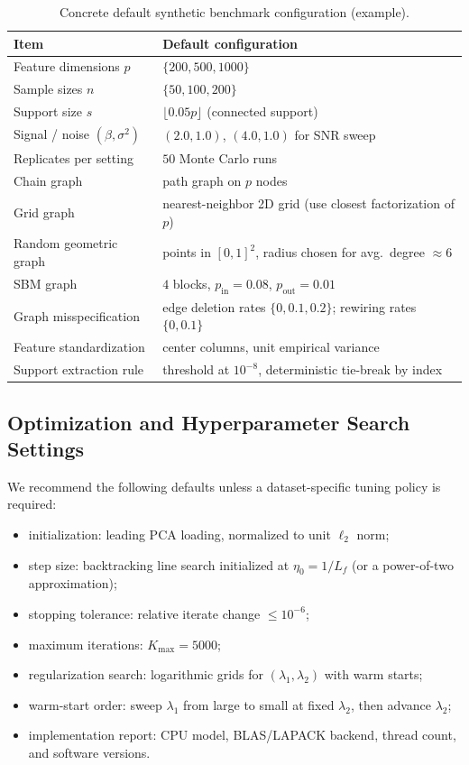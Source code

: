 \documentclass[10pt,twocolumn,letterpaper]{article}
\theoremstyle{definition}
\begin{document}
\begin{table}[t]
\centering
\caption{Concrete default synthetic benchmark configuration (example).}
\label{tab:synthetic_config}
\scriptsize
\begin{tabularx}{\columnwidth}{@{}lY@{}}
\toprule
Item & Default configuration \\
\midrule
Feature dimensions $p$ & $\{200,500,1000\}$ \\
Sample sizes $n$ & $\{50,100,200\}$ \\
Support size $s$ & $\lfloor 0.05p \rfloor$ (connected support) \\
Signal / noise $(\beta,\sigma^2)$ & $(2.0,1.0)$, $(4.0,1.0)$ for SNR sweep \\
Replicates per setting & $50$ Monte Carlo runs \\
Chain graph & path graph on $p$ nodes \\
Grid graph & nearest-neighbor 2D grid (use closest factorization of $p$) \\
Random geometric graph & points in $[0,1]^2$, radius chosen for avg.\ degree $\approx 6$ \\
SBM graph & $4$ blocks, $p_{\mathrm{in}}=0.08$, $p_{\mathrm{out}}=0.01$ \\
Graph misspecification & edge deletion rates $\{0,0.1,0.2\}$; rewiring rates $\{0,0.1\}$ \\
Feature standardization & center columns, unit empirical variance \\
Support extraction rule & threshold at $10^{-8}$, deterministic tie-break by index \\
\bottomrule
\end{tabularx}
\normalsize
\end{table}

\subsection{Optimization and Hyperparameter Search Settings}
We recommend the following defaults unless a dataset-specific tuning policy is required:
\begin{itemize}[leftmargin=*]
\item initialization: leading PCA loading, normalized to unit $\ell_2$ norm;
\item step size: backtracking line search initialized at $\eta_0=1/L_f$ (or a power-of-two approximation);
\item stopping tolerance: relative iterate change $\le 10^{-6}$;
\item maximum iterations: $K_{\max}=5000$;
\item regularization search: logarithmic grids for $(\lambda_1,\lambda_2)$ with warm starts;
\item warm-start order: sweep $\lambda_1$ from large to small at fixed $\lambda_2$, then advance $\lambda_2$;
\item implementation report: CPU model, BLAS/LAPACK backend, thread count, and software versions.
\end{itemize}
\end{document}
